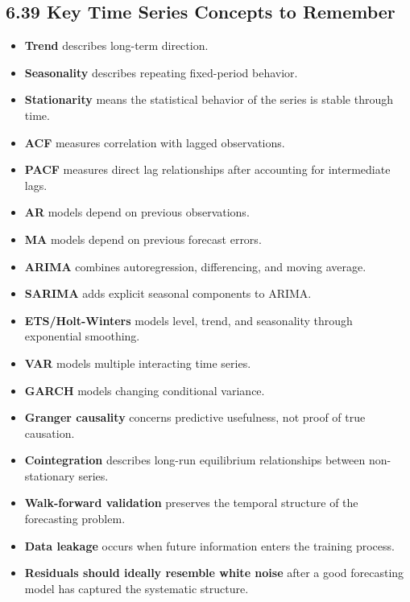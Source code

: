 \documentclass[
  10pt,
  letterpaper,
]{article}
\begin{document}
\hypertarget{key-time-series-concepts-to-remember}{%
\subsection{6.39 Key Time Series Concepts to Remember}\label{key-time-series-concepts-to-remember}}

\begin{itemize}
\item \textbf{Trend} describes long-term direction.
\item \textbf{Seasonality} describes repeating fixed-period behavior.
\item \textbf{Stationarity} means the statistical behavior of the series is stable through time.
\item \textbf{ACF} measures correlation with lagged observations.
\item \textbf{PACF} measures direct lag relationships after accounting for intermediate lags.
\item \textbf{AR} models depend on previous observations.
\item \textbf{MA} models depend on previous forecast errors.
\item \textbf{ARIMA} combines autoregression, differencing, and moving average.
\item \textbf{SARIMA} adds explicit seasonal components to ARIMA.
\item \textbf{ETS/Holt-Winters} models level, trend, and seasonality through exponential smoothing.
\item \textbf{VAR} models multiple interacting time series.
\item \textbf{GARCH} models changing conditional variance.
\item \textbf{Granger causality} concerns predictive usefulness, not proof of true causation.
\item \textbf{Cointegration} describes long-run equilibrium relationships between non-stationary series.
\item \textbf{Walk-forward validation} preserves the temporal structure of the forecasting problem.
\item \textbf{Data leakage} occurs when future information enters the training process.
\item \textbf{Residuals should ideally resemble white noise} after a good forecasting model has captured the systematic structure.
\end{itemize}
\end{document}
